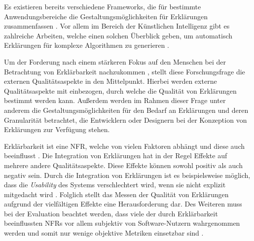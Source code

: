 \smallskip

\noindent{}

\smallskip

Es existieren bereits verschiedene Frameworks, die für bestimmte Anwendungsbereiche die Gestaltungsmöglichkeiten für Erklärungen zusammenfassen \cite{nunes_systematic_2017}. Vor allem im Bereich der Künstlichen Intelligenz gibt es zahlreiche Arbeiten, welche einen solchen Überblick geben, um automatisch Erklärungen für komplexe Algorithmen zu generieren \cite{sokol_explainability_2020, mahoney2019framework}.

Um der Forderung nach einem stärkeren Fokus auf den Menschen bei der Betrachtung von Erklärbarkeit nachzukommen \cite{ehsan_operationalizing_2021}, stellt diese Forschungsfrage die externen Qualitätsaspekte \cite{international2011iso} in den Mittelpunkt. Hierbei werden externe Qualitätsaspekte mit einbezogen, durch welche die Qualität von Erklärungen bestimmt werden kann. Außerdem werden im Rahmen dieser Frage unter anderem die Gestaltungsmöglichkeiten für den Bedarf an Erklärungen und deren Granularität betrachtet, die Entwicklern oder Designern bei der Konzeption von Erklärungen zur Verfügung stehen. 


\smallskip

\noindent{}

\smallskip

Erklärbarkeit ist eine NFR, welche von vielen Faktoren abhängt und diese auch beeinflusst \cite{chazette_knowledge_nodate}. Die Integration von Erklärungen hat in der Regel Effekte auf mehrere andere Qualitätsaspekte. Diese Effekte können sowohl positiv als auch negativ sein. Durch die Integration von Erklärungen ist es beispielsweise möglich, dass die \textit{Usability} des Systems verschlechtert wird, wenn sie nicht explizit mitgedacht wird \cite{sokol_explainability_2020}. Folglich stellt das Messen der Qualität von Erklärungen aufgrund der vielfältigen Effekte eine Herausforderung dar. Des Weiteren muss bei der Evaluation beachtet werden, dass viele der durch Erklärbarkeit beeinflussten NFRs vor allem subjektiv von Software-Nutzern wahrgenommen werden und somit nur wenige objektive Metriken einsetzbar sind \cite{sokol_explainability_2020}.

